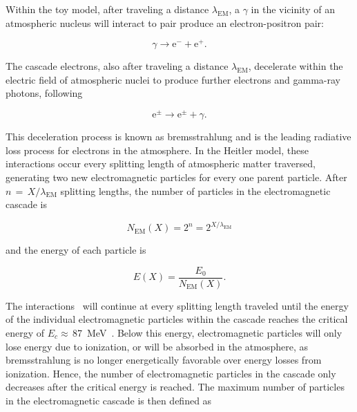 Within the toy model, after traveling a distance $\lambda_{\text{EM}}$, a $\gamma$ in the vicinity of an atmospheric nucleus will interact to pair produce an electron-positron pair:

\begin{equation}
    \gamma \rightarrow \text{e}^{-} + \text{e}^{+}. \label{eq:pair_production}
\end{equation}

\noindent
The cascade electrons, also after traveling a distance $\lambda_{\text{EM}}$, decelerate within the electric field of atmospheric nuclei to produce further electrons and gamma-ray photons, following

\begin{equation}
    \text{e}^{\pm} \rightarrow \text{e}^{\pm} + \gamma. \label{eq:bremsstrahlung}
\end{equation}

\noindent
This deceleration process is known as bremsstrahlung and is the leading radiative loss process for electrons in the atmosphere.
In the Heitler model, these interactions occur every splitting length of atmospheric matter traversed, generating two new electromagnetic particles for every one parent particle.
After $n\,=\,X / \lambda_{\text{EM}}$ splitting lengths, the number of particles in the electromagnetic cascade is

\begin{equation}
    N_{\text{EM}}\left(X\right) = 2^{n} = 2^{X / \lambda_{\text{EM}}} \label{eq:em_particle_number}
\end{equation}

\noindent
and the energy of each particle is

\begin{equation}
    E\left(X\right) = \frac{E_{0}}{N_{\text{EM}}\left(X\right)}. \label{eq:em_particle_energy}
\end{equation}

The interactions~ will continue at every splitting length traveled until the energy of the individual electromagnetic particles within the cascade reaches the critical energy of $E_{c}\approx$\,\qty{87}{\mega\electronvolt}~\cite{tom_book}.
Below this energy, electromagnetic particles will only lose energy due to ionization, or will be absorbed in the atmosphere, as bremsstrahlung is no longer energetically favorable over energy losses from ionization.
Hence, the number of electromagnetic particles in the cascade only decreases after the critical energy is reached.
The maximum number of particles in the electromagnetic cascade is then defined as

